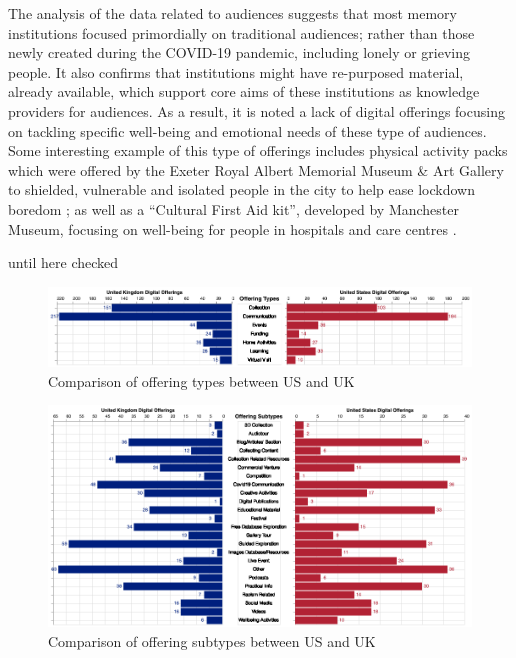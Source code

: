 \documentclass{egpubl}
\begin{document}
The analysis of the data related to audiences suggests that most memory institutions focused primordially on traditional audiences;  rather than those newly created during the COVID-19 pandemic, including lonely or grieving people. It also confirms that institutions might have re-purposed material, already available, which support core aims of these institutions as knowledge providers for audiences. As a result, it is noted a lack of digital offerings focusing on tackling specific well-being and emotional needs of these type of audiences. Some interesting example  of this  type of offerings includes physical activity packs which were offered by the Exeter Royal Albert Memorial Museum \& Art Gallery to shielded, vulnerable and isolated people in the city to help ease lockdown boredom \cite{ex2020}; as well as a ``Cultural First Aid kit'', developed by Manchester Museum, focusing on well-being for people in hospitals and care centres \cite{man2020}. 

\color{red}until here checked \color{black}



\begin{figure}[h]
  \centering
  \includegraphics[width=\linewidth]{images/typecomparison.png}
  \caption{\label{fig:TypeComparison}
           Comparison of offering types between US and UK}
\end{figure}
\begin{figure}[h]
  \centering
  \includegraphics[width=\linewidth]{images/subtypecomparison.png}
  \caption{\label{fig:SubTypeComparison}
           Comparison of offering subtypes between US and UK}
\end{figure}
\end{document}
